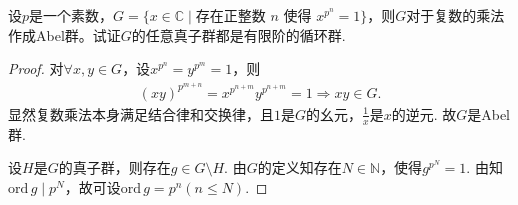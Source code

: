 \documentclass[../../main.tex]{subfiles}%
\begin{document}
\begin{example}
设$p$是一个素数，$G=\{x\in\mathbb{C}\mid \text{存在正整数 }n\text{ 使得 }x^{p^n}=1\}$，则$G$对于复数的乘法作成Abel群。试证$G$的任意真子群都是有限阶的循环群.
\end{example}
\begin{proof}

对$\forall x,y\in G$，设$x^{p^n}=y^{p^m}=1$，则
\begin{align*}
(xy)^{p^{m+n}}=x^{p^{n+m}}y^{p^{n+m}}=1\Longrightarrow xy\in G.
\end{align*}
显然复数乘法本身满足结合律和交换律，且$1$是$G$的幺元，$\frac{1}{x}$是$x$的逆元. 故$G$是Abel群.

设$H$是$G$的真子群，则存在$g\in G\setminus H$. 由$G$的定义知存在$N\in\mathbb{N}$，使得$g^{p^N}=1$. 由知$\mathrm{ord}\,g\mid p^N$，故可设$\mathrm{ord}\,g=p^n(n\leqslant N)$.


\end{proof}
\end{document}
